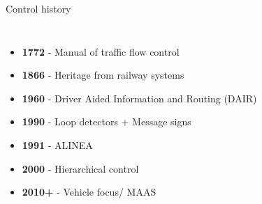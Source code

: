 \begin{frame}{Control history}
    \begin{columns}
    \begin{itemize}
      \item \textbf{1772} - Manual of traffic flow control
      \item \textbf{1866} - Heritage from railway systems
      \item \textbf{1960} - Driver Aided Information and Routing (DAIR)
      \item \textbf{1990} - Loop detectors + Message signs
      \item \textbf{1991} - ALINEA
      \item \textbf{2000} - Hierarchical control
      \item \textbf{2010+} - Vehicle focus/ MAAS
    \end{itemize}
    \begin{figure}
    \end{figure}
    \end{columns}
\end{frame}